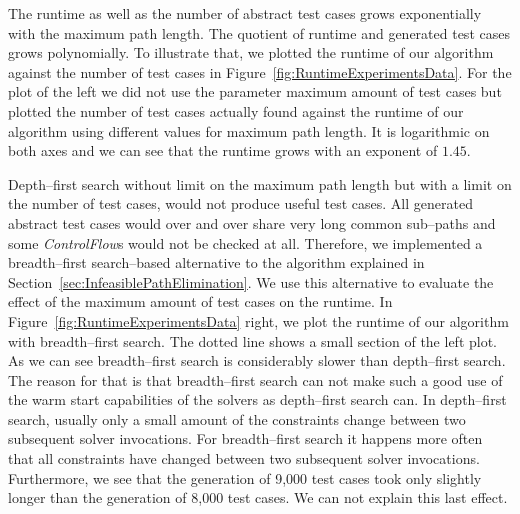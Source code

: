 \documentclass[runningheads,a4paper]{llncs}%
\newcommand{\UMLType}[1]{\textsf{\textit{#1}}} %
\begin{document}
The runtime as well as the number of abstract test cases grows exponentially
with the maximum path length. The quotient of runtime and generated test cases
grows polynomially. To illustrate that, we plotted the runtime of our algorithm
against the number of test cases in Figure~\ref{fig:RuntimeExperimentsData}.
For the plot of the left we did not use the parameter maximum amount of test
cases but plotted the number of test cases actually found against the runtime of
our algorithm using different values for maximum path length. It is logarithmic
on both axes and we can see that the runtime grows with an exponent of $1.45$.

Depth--first search without limit on the maximum path length but with a limit on
the number of test cases, would not produce useful test cases. All generated
abstract test cases would over and over share very long common sub--paths and
some \UMLType{ControlFlow}s would not be checked at all. Therefore, we
implemented a breadth--first search--based alternative to the algorithm
explained in Section~\ref{sec:InfeasiblePathElimination}. We use this
alternative to evaluate the effect of the maximum amount of test cases on the
runtime.
In Figure~\ref{fig:RuntimeExperimentsData} right, we plot the runtime of
our algorithm with breadth--first search. The dotted line
shows a small section of the left plot. As we can see breadth--first search is
considerably slower than depth--first search. The reason for that is that
breadth--first search can not make such a good use of the warm start
capabilities of the solvers as depth--first search can. In depth--first search,
usually only a small amount of the constraints change between two subsequent
solver invocations. For breadth--first search it happens more often that all constraints have changed between two
subsequent solver invocations. Furthermore, we see that the generation of 9,000
test cases took only slightly longer than the generation of 8,000 test cases. We
can not explain this last effect.
\end{document}
